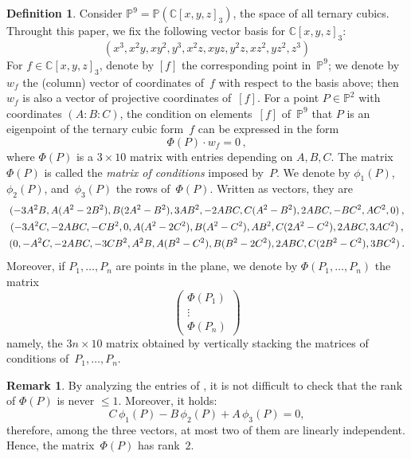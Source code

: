 \documentclass[11pt, a4paper, reqno, captions=tableheading,bibliography=totoc]{scrartcl}
\theoremstyle{plain}
\theoremstyle{definition}
\newtheorem{definition}[lemma]{Definition}
\newtheorem{rmk}[lemma]{Remark}
\newcommand{\C}{\mathbb{C}}
\newcommand{\p}{\mathbb{P}}
\newcommand\scalemath[2]{\scalebox{#1}{\mbox{\ensuremath{\displaystyle #2}}}}
\begin{document}
\begin{definition}
\label{definition:matrix_conditions}
 Consider $\p^9 = \p(\C[x,y,z]_3)$, the space of all ternary cubics.
 Throught this paper, we fix the following vector basis for $\C[x,y,z]_3$:
 \[
  (x^3, x^2 y, x y^2, y^3, x^2 z, x y z, y^2 z, x z^2, y z^2, z^3)
 \]
 For $f \in \C[x,y,z]_3$, denote by $[f]$ the corresponding point in~$\p^9$; we denote by $w_f$ the (column) vector of coordinates of~$f$ with respect to the basis above; then $w_f$ is also a vector of projective coordinates of~$[f]$.
 For a point $P \in \p^2$ with coordinates $(A: B: C)$, the condition on elements~$[f]$ of~$\p^9$ that $P$ is an eigenpoint of the ternary cubic form~$f$ can be expressed in the form
 \[
  \Phi(P) \cdot w_f
  = 0 \,,
 \]
 where $\Phi(P)$ is a $3 \times 10$ matrix with entries depending on $A, B, C$.
 The matrix $\Phi(P)$ is called the \emph{matrix of conditions} imposed by~$P$.
We denote by $\phi_1(P)$, $\phi_2(P)$, and~$\phi_3(P)$ the rows of~$\Phi(P)$.
Written as vectors, they are
%
\begin{equation}
\label{equation:matrix_conditions_rows}
\begin{gathered}
\scalemath{0.9}{(-3A^2B, A(A^2 - 2B^2), B(2A^2 - B^2), 3AB^2,
 -2ABC, C(A^2 - B^2), 2 ABC,
 -B  C^2, A  C^2, 0)} \,, \\
\scalemath{0.9}{(-3A^2 C,
-2ABC,
-CB^2,
0,
A(A^2-2C^2),
B(A^2 - C^2),
AB^2,
C(2A^2-C^2),
2ABC,
3AC^2)} \,,\\
\scalemath{0.9}{(0,
-A^2C,
-2ABC,
-3CB^2,
A^2 B,
A(B^2 - C^2),
B(B^2-2C^2),
2ABC,
C(2B^2-C^2),
3BC^2)} \,.
\end{gathered}
\end{equation}
%
Moreover, if $P_1, \dotsc, P_n$ are points in the plane, we denote by $\Phi(P_1, \dotsc, P_n)$ the matrix
%
\[
 \left(
 \begin{array}{c}
  \Phi(P_1) \\
  \vdots \\
  \Phi(P_n)
 \end{array}
 \right)
\]
%
namely, the $3n \times 10$ matrix obtained by vertically stacking the matrices of conditions of~$P_1, \dotsc, P_n$.
\end{definition}

\begin{rmk}
By analyzing the entries of , it is not difficult to check that the rank of
$\Phi(P)$ is never $\leq 1$.
Moreover, it holds:
\begin{equation}
  C \, \phi_1(P) - B \, \phi_2(P) + A \, \phi_3(P) = 0,
  \label{eq:base}
\end{equation}
therefore,
among the three vectors, at most two of them are linearly independent.
Hence, the matrix~$\Phi(P)$ has rank~$2$.
\end{rmk}
\end{document}
